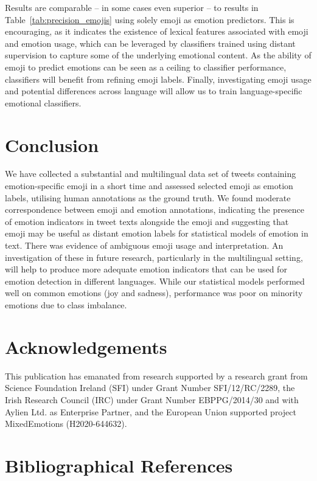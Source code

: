 \documentclass[10pt, a4paper]{article}
\begin{document}
Results are comparable -- in some cases even superior -- to results in Table~\ref{tab:precision_emojis} using solely emoji as emotion predictors. This is encouraging, as it indicates the existence of lexical features associated with emoji and emotion usage, which can be leveraged by classifiers trained using distant supervision to capture some of the underlying emotional content. As the ability of emoji to predict emotions can be seen as a ceiling to classifier performance, classifiers will benefit from refining emoji labels. Finally, investigating emoji usage and potential differences across language will allow us to train language-specific emotional classifiers.

\section{Conclusion}
We have collected a substantial and multilingual data set of tweets containing emotion-specific emoji in a short time and assessed selected emoji as emotion labels, utilising human annotations as the ground truth. We found moderate correspondence between emoji and emotion annotations, indicating the presence of emotion indicators in tweet texts alongside the emoji and suggesting that emoji may be useful as distant emotion labels for statistical models of emotion in text. 
There was evidence of ambiguous emoji usage and interpretation. 
An investigation of these in future research, particularly in the multilingual setting, will help to produce more adequate emotion indicators that can be used for emotion detection in different languages. 
While our statistical models performed well on common emotions (joy and sadness), performance was poor on minority emotions due to class imbalance. 

\section*{Acknowledgements}

This publication has emanated from research supported by a research grant from Science Foundation Ireland (SFI) under Grant Number SFI/12/RC/2289,
the Irish Research Council (IRC) under Grant Number EBPPG/2014/30 and with Aylien Ltd. as Enterprise Partner, 
 and the European Union supported project MixedEmotions (H2020-644632).

\section{Bibliographical References}
\label{m%
%
%
ain:ref}


% 

\end{document}
